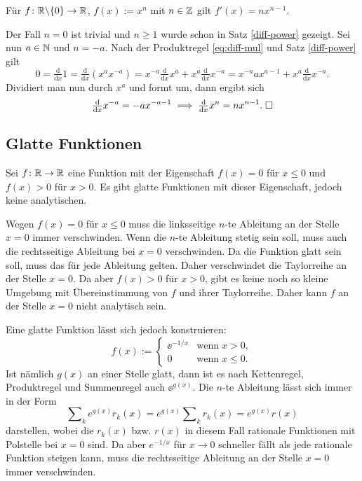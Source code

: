 \begin{Satz}
Für $f\colon\mathbb R{\setminus}\{0\}\to\mathbb R$, $f(x):=x^n$ mit $n\in\mathbb Z$
gilt $f'(x)=nx^{n-1}$.
\end{Satz}
\begin{Beweis}
Der Fall $n=0$ ist trivial und $n\ge 1$ wurde schon in Satz
\ref{diff-power} gezeigt. Sei nun $a\in\mathbb N$ und $n=-a$. Nach der
Produktregel \eqref{eq:diff-mul} und Satz \ref{diff-power} gilt
\begin{equation}
0 = \tfrac{\mathrm d}{\mathrm dx} 1
= \tfrac{\mathrm d}{\mathrm dx} (x^a x^{-a})
= x^{-a}\tfrac{\mathrm d}{\mathrm dx} x^a+x^a\tfrac{\mathrm d}{\mathrm dx} x^{-a}
= x^{-a}ax^{a-1}+x^a\tfrac{\mathrm d}{\mathrm dx} x^{-a}.
\end{equation}
Dividiert man nun durch $x^a$ und formt um, dann ergibt sich
\begin{equation}
\tfrac{\mathrm d}{\mathrm dx} x^{-a} = -ax^{-a-1}
\implies \tfrac{\mathrm d}{\mathrm dx} x^n = nx^{n-1}.\;\square
\end{equation}
\end{Beweis}

\newpage
\subsection{Glatte Funktionen}

\begin{Satz}
Sei $f\colon\mathbb R\to\mathbb R$ eine Funktion mit der Eigenschaft
$f(x)=0$ für $x\le 0$ und $f(x)>0$ für $x>0$. Es gibt glatte Funktionen
mit dieser Eigenschaft, jedoch keine analytischen.
\end{Satz}

\begin{Beweis}
Wegen $f(x)=0$ für $x\le 0$ muss die linksseitige $n$-te Ableitung
an der Stelle $x=0$ immer verschwinden. Wenn die $n$-te Ableitung
stetig sein soll, muss auch die rechtsseitige Ableitung bei $x=0$
verschwinden. Da die Funktion glatt sein soll, muss das für jede
Ableitung gelten. Daher verschwindet die Taylorreihe an der Stelle
$x=0$. Da aber $f(x)>0$ für $x>0$, gibt es keine noch so kleine
Umgebung mit Übereinstimmung von $f$ und ihrer Taylorreihe.
Daher kann $f$ an der Stelle $x=0$ nicht analytisch sein.

Eine glatte Funktion lässt sich jedoch konstruieren:
\[f(x):=\begin{cases}
\ee^{-1/x}&\text{wenn}\;x>0,\\
0&\text{wenn}\;x\le 0.
\end{cases}\]
Ist nämlich $g(x)$ an einer Stelle glatt, dann ist
es nach Kettenregel, Produktregel und Summenregel auch $\ee^{g(x)}$.
Die $n$-te Ableitung lässt sich immer in der Form%
\[\sum\nolimits_k e^{g(x)}{r_k(x)}
= e^{g(x)}\sum\nolimits_k r_k(x) = e^{g(x)}r(x)\]
darstellen, wobei die $r_k(x)$ bzw. $r(x)$ in diesem Fall rationale
Funktionen mit Polstelle bei $x=0$ sind. Da aber $e^{-1/x}$ für
$x\to 0$ schneller fällt als jede rationale Funktion steigen kann,
muss die rechtsseitige Ableitung an der Stelle $x=0$ immer
verschwinden.\;\qedsymbol
\end{Beweis}


